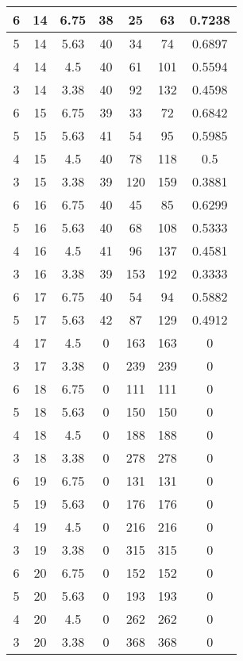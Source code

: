 \documentclass[letterpaper, 12pt]{article}
\begin{document}
\begin{longtable}{|c|c|c|c|c|c|c|}
\hline
6 & 14 & 6.75 & 38 & 25 & 63 & 0.7238 \\
\hline
5 & 14 & 5.63 & 40 & 34 & 74 & 0.6897 \\
\hline
4 & 14 & 4.5 & 40 & 61 & 101 & 0.5594 \\
\hline
3 & 14 & 3.38 & 40 & 92 & 132 & 0.4598 \\
\hline
6 & 15 & 6.75 & 39 & 33 & 72 & 0.6842 \\
\hline
5 & 15 & 5.63 & 41 & 54 & 95 & 0.5985 \\
\hline
4 & 15 & 4.5 & 40 & 78 & 118 & 0.5 \\
\hline
3 & 15 & 3.38 & 39 & 120 & 159 & 0.3881 \\
\hline
6 & 16 & 6.75 & 40 & 45 & 85 & 0.6299 \\
\hline
5 & 16 & 5.63 & 40 & 68 & 108 & 0.5333 \\
\hline
4 & 16 & 4.5 & 41 & 96 & 137 & 0.4581 \\
\hline
3 & 16 & 3.38 & 39 & 153 & 192 & 0.3333 \\
\hline
6 & 17 & 6.75 & 40 & 54 & 94 & 0.5882 \\
\hline
5 & 17 & 5.63 & 42 & 87 & 129 & 0.4912 \\
\hline
4 & 17 & 4.5 & 0 & 163 & 163 & 0 \\
\hline
3 & 17 & 3.38 & 0 & 239 & 239 & 0 \\
\hline
6 & 18 & 6.75 & 0 & 111 & 111 & 0 \\
\hline
5 & 18 & 5.63 & 0 & 150 & 150 & 0 \\
\hline
4 & 18 & 4.5 & 0 & 188 & 188 & 0 \\
\hline
3 & 18 & 3.38 & 0 & 278 & 278 & 0 \\
\hline
6 & 19 & 6.75 & 0 & 131 & 131 & 0 \\
\hline
5 & 19 & 5.63 & 0 & 176 & 176 & 0 \\
\hline
4 & 19 & 4.5 & 0 & 216 & 216 & 0 \\
\hline
3 & 19 & 3.38 & 0 & 315 & 315 & 0 \\
\hline
6 & 20 & 6.75 & 0 & 152 & 152 & 0 \\
\hline
5 & 20 & 5.63 & 0 & 193 & 193 & 0 \\
\hline
4 & 20 & 4.5 & 0 & 262 & 262 & 0 \\
\hline
3 & 20 & 3.38 & 0 & 368 & 368 & 0 \\
\hline
\end{longtable}
\end{document}
